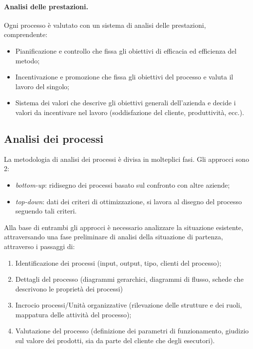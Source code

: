 \documentclass[a4paper, 11pt]{article}
\begin{document}
	\paragraph{Analisi delle prestazioni.} Ogni processo è valutato con un sistema di analisi delle prestazioni, comprendente: \begin{itemize}
		\item Pianificazione e controllo che fissa gli obiettivi di efficacia ed efficienza del metodo;
		\item Incentivazione e promozione che fissa gli obiettivi del processo e valuta il lavoro del singolo;
		\item Sistema dei valori che descrive gli obiettivi generali dell'azienda e decide i valori da incentivare nel lavoro (soddisfazione del cliente, produttività, ecc.).
	\end{itemize}

	\subsection{Analisi dei processi}
	La metodologia di analisi dei processi è divisa in molteplici fasi. Gli approcci sono 2:
	\begin{itemize}
		\item \textit{bottom-up}: ridisegno dei processi basato sul confronto con altre aziende;
		\item \textit{top-down}: dati dei criteri di ottimizzazione, si lavora al disegno del processo seguendo tali criteri.
	\end{itemize}

	Alla base di entrambi gli approcci è necessario analizzare la situazione esistente, attraversando una fase preliminare di analisi della situazione di partenza, attraverso i passaggi di:
	\begin{enumerate}
		\item Identificazione dei processi (input, output, tipo, clienti del processo);
		\item Dettagli del processo (diagrammi gerarchici, diagrammi di flusso, schede che descrivono le proprietà dei processi)
		\item Incrocio processi/Unità organizzative (rilevazione delle strutture e dei ruoli, mappatura delle attività del processo);
		\item Valutazione del processo (definizione dei parametri di funzionamento, giudizio sul valore dei prodotti, sia da parte del cliente che degli esecutori).
	\end{enumerate}
\end{document}

